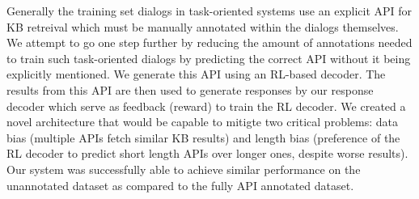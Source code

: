Generally the training set dialogs in task-oriented systems use an explicit API for KB retreival which must be manually annotated within the dialogs themselves. We attempt to go one step further by reducing the amount of annotations needed to train such task-oriented dialogs by predicting the correct API without it being explicitly mentioned. We generate this API using an RL-based decoder. The results from this API are then used to generate responses by our response decoder which serve as feedback (reward) to train the RL decoder. We created a novel architecture that would be capable to mitigte two critical problems: data bias (multiple APIs fetch similar KB results) and length bias (preference of the RL decoder to predict short length APIs over longer ones, despite worse results). Our system was successfully able to achieve similar performance on the unannotated dataset as compared to the fully API annotated dataset.

